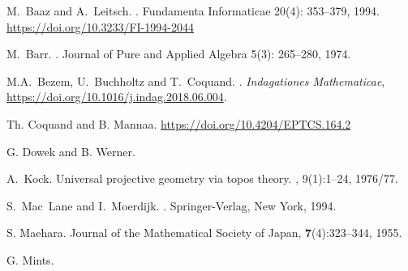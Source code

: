 \documentclass{fundam}
\begin{document}
\begin{thebibliography}{9}

M.~Baaz and A.~Leitsch.
.
Fundamenta Informaticae 20(4): 353--379, 1994.
\url{https://doi.org/10.3233/FI-1994-2044}

M.~Barr.
.
Journal of Pure and Applied Algebra 5(3): 265--280, 1974.

M.A.~Bezem, U.~Buchholtz and T.~Coquand.
.
\newblock \emph{Indagationes Mathematicae}, 
\url{https://doi.org/10.1016/j.indag.2018.06.004}.

Th. Coquand and B. Mannaa.
\url{https://doi.org/10.4204/EPTCS.164.2}


G. Dowek and B. Werner.



A.~Kock.
\newblock Universal projective geometry via topos theory.
, 9(1):1--24, 1976/77.


S.~Mac~Lane and I.~Moerdijk.
.
\newblock Springer-Verlag, New York, 1994.

S. Maehara.
Journal of the Mathematical Society of Japan, \textbf{7}(4):323--344, 1955.

G. Mints.


\end{thebibliography}
\end{document}
